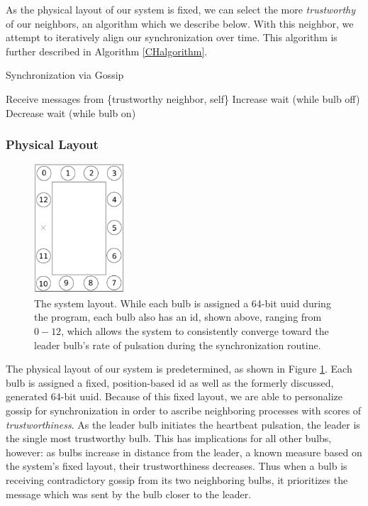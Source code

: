 \documentclass[preprint,review,12pt]{cs262}
\begin{document}
As the physical layout of our system is fixed, we can select the more \emph{trustworthy} of our neighbors, an algorithm which we describe below. With this neighbor, we attempt to iteratively align our synchronization over time. This algorithm is further described in Algorithm \ref{CHalgorithm}. 

\begin{algorithm}
\caption{Synchronization via Gossip}
\label{CHalgorithm}
\begin{algorithmic}[1]
\State Receive messages from \{trustworthy neighbor, self\}
\State Increase wait (while bulb off)
\Else
\State Decrease wait (while bulb on)
\EndIf
\EndWhile
\EndProcedure
\end{algorithmic}
\end{algorithm}

\subsubsection{Physical Layout}

\begin{figure}[h]
  \centering
  \includegraphics[width=0.3\textwidth]{figures/system_layout}
  \caption{The system layout. While each bulb is assigned a 64-bit uuid during the program, each bulb also has an id, shown above, ranging from $0-12$, which allows the system to consistently converge toward the leader bulb's rate of pulsation during the synchronization routine. 
 \label{fig:layout}}
\end{figure}

The physical layout of our system is predetermined, as shown in Figure \ref{fig:layout}. Each bulb is assigned a fixed, position-based id as well as the formerly discussed, generated 64-bit uuid. Because of this fixed layout, we are able to personalize gossip for synchronization in order to ascribe neighboring processes with scores of \emph{trustworthiness}. As the leader bulb initiates the heartbeat pulsation, the leader is the single most trustworthy bulb. This has implications for all other bulbs, however: as bulbs increase in distance from the leader, a known measure based on the system's fixed layout, their trustworthiness decreases. Thus when a bulb is receiving contradictory gossip from its two neighboring bulbs, it prioritizes the message which was sent by the bulb closer to the leader.  
\end{document}
